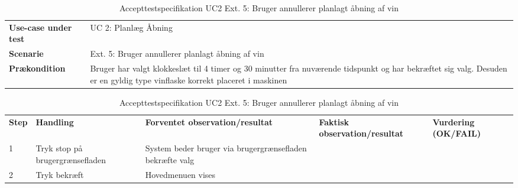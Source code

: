 \begin{table}[H]
	\centering
	\caption{Accepttestspecifikation UC2 Ext. 5: Bruger annullerer planlagt åbning af vin}
	\label{ATUC2:Ext2}
	\begin{tabular}{ p{80pt}  p{320pt} }\hline
		\rowcolor{lightgray}	
		\textbf{Use-case under test} & UC 2: Planlæg Åbning \\
		\rowcolor{white}
		\textbf{Scenarie} & Ext. 5: Bruger annullerer planlagt åbning af vin \\\rowcolor{lightgray}	
		\textbf{Prækondition} &
		Bruger har valgt klokkeslæt til 4 timer og 30 minutter fra nuværende tidspunkt og har bekræftet sig valg. Desuden er en gyldig type vinflaske korrekt placeret i maskinen \\
		\hline
	\end{tabular}
	\begin{tabular}{  p{26pt} p{100pt}  p{101pt} | p{67pt} | p{68pt}}
		\textbf{Step} & \textbf{Handling} & \textbf{Forventet observation/resultat} & \textbf{Faktisk observation/resultat} & \textbf{Vurdering (OK/FAIL)}\\
		1 & Tryk stop på brugergrænsefladen & System beder bruger via brugergrænsefladen bekræfte valg
 &  &  \\
 		2 & Tryk bekræft & Hovedmenuen vises\\
		\hline
	\end{tabular}
\end{table}




